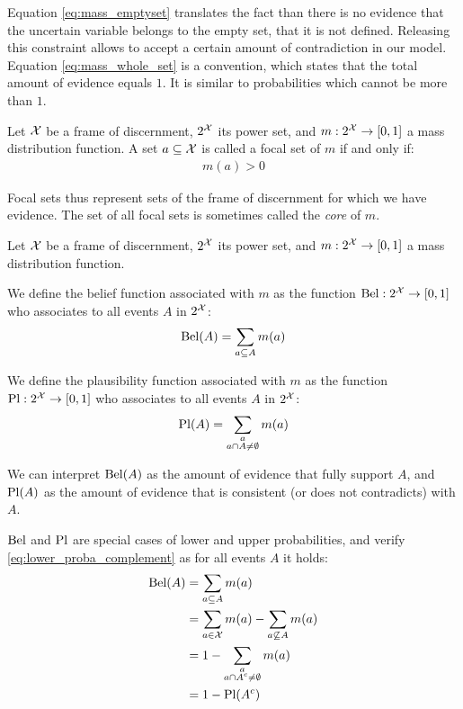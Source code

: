 \begin{remark}
    Equation \eqref{eq:mass_emptyset} translates the fact than there is no evidence that the uncertain variable belongs to the empty set, \ie that it is not defined. Releasing this constraint allows to accept a certain amount of contradiction in our model.
    Equation \eqref{eq:mass_whole_set} is a convention, which states that the total amount of evidence equals $1$. It is similar to probabilities which cannot be more than $1$. 
\end{remark}

\begin{definition}\label{def:focal_set}
    Let ${\mathcal{X}}$ be a frame of discernment, $2^{\mathcal{X}}$ its power set, and $m:2^{\mathcal{X}}\rightarrow[0,1]$ a mass distribution function. A set $a\subseteq{\mathcal{X}}$ is called a focal set of $m$ if and only if:
    \begin{align}
        m(a)>0\label{eq:focal_set}
    \end{align}
\end{definition}
Focal sets thus represent sets of the frame of discernment for which we have evidence. The set of all focal sets is sometimes called the \textit{core} of $m$.

\begin{definition}\label{def:belief_plausibility}
    Let ${\mathcal{X}}$ be a frame of discernment, $2^{\mathcal{X}}$ its power set, and $m:2^{\mathcal{X}}\rightarrow[0,1]$ a mass distribution function.
    
    We define the belief function associated with $m$ as the function ${\mathrm{Bel}}:2^{\mathcal{X}}\rightarrow[0,1]$ who associates to all events $A$ in $2^{\mathcal{X}}$:
    \begin{align*}
        {\mathrm{Bel}}(A)=\sum_{a\subseteq A} m(a)
    \end{align*}
    
    We define the plausibility function associated with $m$ as the function ${\mathrm{Pl}} :2^{\mathcal{X}}\rightarrow[0,1]$ who associates to all events $A$ in $2^{\mathcal{X}}$:
    \begin{align*}
        {\mathrm{Pl}}(A)=\sum_{\substack{a\\a\cap A\neq\emptyset}} m(a)
    \end{align*}
\end{definition}
We can interpret ${\mathrm{Bel}}(A)$ as the amount of evidence that fully support $A$, and ${\mathrm{Pl}}(A)$ as the amount of evidence that is consistent (or does not contradicts) with $A$.

${\mathrm{Bel}}$ and ${\mathrm{Pl}}$ are special cases of lower and upper probabilities, and verify \eqref{eq:lower_proba_complement} as for all events $A$ it holds:
\begin{align*}
    {\mathrm{Bel}}(A)&=\sum_{a\subseteq A} m(a)\\
    &= \sum_{a\in {\mathcal{X}}} m(a) - \sum_{a\not\subseteq A} m(a)\\
    &= 1 - \sum_{\substack{a\\a\cap A^c\neq\emptyset}} m(a)\\
    &=1-{\mathrm{Pl}}(A^c)
\end{align*}

